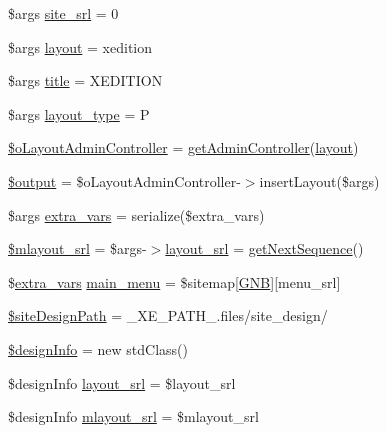 \begin{DoxyCompactItemize}
\$args \hyperlink{ko_8install_8php_a8b1406b4ad1048041558dce6bfe89004}{site\+\_\+srl} = 0
\item 
\$args \hyperlink{ko_8install_8php_a0dc2cdff7167f362443808ff71ae5177}{layout} = \textquotesingle{}xedition\textquotesingle{}
\item 
\$args \hyperlink{ko_8install_8php_a5b072c5fd1d2228c6ba5cee13cd142e3}{title} = \textquotesingle{}X\+E\+D\+I\+T\+I\+O\+N\textquotesingle{}
\item 
\$args \hyperlink{ko_8install_8php_a0532d89570cfdaebc628afac2ff5a81b}{layout\+\_\+type} = \textquotesingle{}P\textquotesingle{}
\item 
\hyperlink{ko_8install_8php_a6a03496003da7df71cf94d9accb430be}{\$o\+Layout\+Admin\+Controller} = \hyperlink{func_8inc_8php_a2f7ca88a5226536aca3b2f5682bd7b2d}{get\+Admin\+Controller}(\textquotesingle{}\hyperlink{classlayout}{layout}\textquotesingle{})
\item 
\hyperlink{ko_8install_8php_a73004ce9cd673c1bfafd1dc351134797}{\$output} = \$o\+Layout\+Admin\+Controller-\/$>$insert\+Layout(\$args)
\item 
\$args \hyperlink{ko_8install_8php_ae1dcb37fc34a8f312d2e6abd6f806743}{extra\+\_\+vars} = serialize(\$extra\+\_\+vars)
\item 
\hyperlink{ko_8install_8php_a576210f0eec2e42df2c40e04a3972bb0}{\$mlayout\+\_\+srl} = \$args-\/$>$\hyperlink{ko_8install_8php_a70054876db09b2519a1726663c8dd9e7}{layout\+\_\+srl} = \hyperlink{func_8inc_8php_a5a97b458f9c5b4fe3574671840aee27c}{get\+Next\+Sequence}()
\item 
\$\hyperlink{ko_8install_8php_ae1dcb37fc34a8f312d2e6abd6f806743}{extra\+\_\+vars} \hyperlink{ko_8install_8php_ac71104c770b8ced3891f35849d3f2906}{main\+\_\+menu} = \$sitemap\mbox{[}\textquotesingle{}\hyperlink{ko_8install_8php_a9b1716b68fc04f3492448f38148dcbf5}{G\+N\+B}\textquotesingle{}\mbox{]}\mbox{[}\textquotesingle{}menu\+\_\+srl\textquotesingle{}\mbox{]}
\item 
\hyperlink{ko_8install_8php_a0b79a974b91157b79d83cc0be7e3247c}{\$site\+Design\+Path} = \+\_\+\+X\+E\+\_\+\+P\+A\+T\+H\+\_\+.\textquotesingle{}files/site\+\_\+design/\textquotesingle{}
\item 
\hyperlink{ko_8install_8php_a99e144f7d563ceb76b003d54739b3b0c}{\$design\+Info} = new std\+Class()
\item 
\$design\+Info \hyperlink{ko_8install_8php_a70054876db09b2519a1726663c8dd9e7}{layout\+\_\+srl} = \$layout\+\_\+srl
\item 
\$design\+Info \hyperlink{ko_8install_8php_a9cf497537007b08c645bed35f564be54}{mlayout\+\_\+srl} = \$mlayout\+\_\+srl

\end{DoxyCompactItemize}
